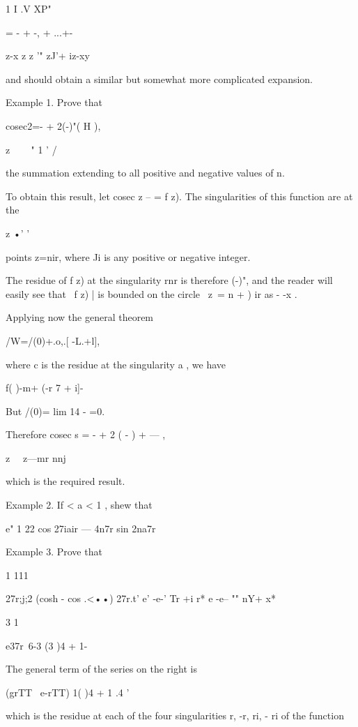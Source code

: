 1 I .V XP" 

= - + -, + ...+- 



z-x z  z '"  zJ'+ iz-xy 

and should obtain a similar but somewhat more complicated expansion. 

Example 1. Prove that 

cosec2=- + 2(-)"( H ), 

z \ \  ~ "   1 '  / 

the summation extending to all positive and negative values of n. 

To obtain this result, let cosec z -- = f z). The singularities of this function are at the 

z •'   ' 

points z=nir, where Ji is any positive or negative integer. 

The residue of f z) at the singularity rnr is therefore (-)", and the reader will easily 
see that \ f z) | is bounded on the circle \ z\ =  n +  ) ir as  - -x . 

Applying now the general theorem 

/W=/(0)+.o,.[ -L.+l], 

where c  is the residue at the singularity a  , we have 



f( )-m+ (-r 7  + i]- 



But /(0)= lim 14 - =0. 

Therefore cosec s = - + 2 ( - )  + — , 

z \ \  z—mr nnj 

which is the required result. 

Example 2. If < a < 1 , shew that 

e"  1  22 cos 27iair — 4n7r sin 2na7r 



Example 3. Prove that 

1 111 



27r;j;2 (cosh  - cos .<••) 27r.t'  e' -e-'  Tr +i r*   e -e-- ""   nY+ x* 

3 1 



e37r\  6-3 (3 )4 + 1-  

The general term of the series on the right is 

(grTT \  e-rTT) 1( )4 + 1 .4  ' 

which is the residue at each of the four singularities r, -r, ri, - ri of the function 



